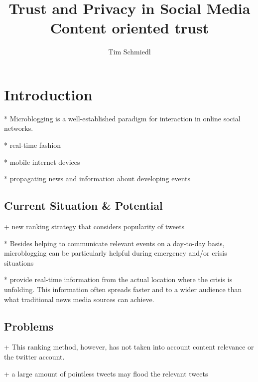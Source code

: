 \documentclass{proseminar}
\begin{document}

\title{Trust and Privacy in Social Media \\
\huge Content oriented trust}

\author{
Tim Schmiedl\\
}

\maketitle

\section{Introduction}
* Microblogging is a well-established paradigm for interaction in online social networks. 

* real-time fashion 

* mobile internet devices 

* propagating news and information about developing events 





\subsection*{Current Situation \& Potential}
+ new ranking strategy that considers popularity of tweets

* Besides helping to communicate relevant events on a day-to-day basis, microblogging can be particularly helpful during emergency and/or crisis
situations 

* provide real-time information from the actual location where the crisis is unfolding. This
information often spreads faster and to a wider audience than what traditional news
media sources can achieve.




\subsection*{Problems}
+ This ranking method, however, has not taken into account content relevance or the twitter account.

+ a large amount of pointless tweets may flood the relevant tweets
\end{document}
